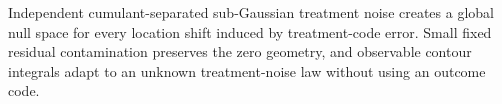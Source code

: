 Independent cumulant-separated sub-Gaussian treatment noise creates a global null space for every location shift induced by treatment-code error.  Small fixed residual contamination preserves the zero geometry, and observable contour integrals adapt to an unknown treatment-noise law without using an outcome code.